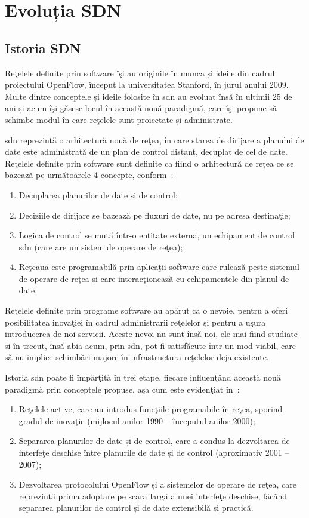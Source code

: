 \section{Evoluția SDN}

\subsection{Istoria SDN}

Reţelele definite prin software îşi au originile în munca și ideile din cadrul proiectului OpenFlow, început la universitatea Stanford, în jurul anului 2009. Multe dintre conceptele și ideile folosite în \gls{sdn} au evoluat însă în ultimii 25 de ani și acum îşi găsesc locul în această nouă paradigmă, care îşi propune să schimbe modul în care reţelele sunt proiectate și administrate.

\gls{sdn} reprezintă o arhitectură nouă de reţea, în care starea de dirijare a planului de date este administrată de un plan de control distant, decuplat de cel de date. Reţelele definite prin software sunt definite ca fiind o arhitectură de rețea ce se bazează pe următoarele 4 concepte, conform~\cite{kreutz2015software}:
\begin{enumerate}
	\item Decuplarea planurilor de date și de control;
	\item Deciziile de dirijare se bazează pe fluxuri de date, nu pe adresa destinaţie;
	\item Logica de control se mută într-o entitate externă, un echipament de control \gls{sdn} (care are un sistem de operare de reţea);
	\item Reţeaua este programabilă prin aplicaţii software care rulează peste sistemul de operare de reţea și care interacţionează cu echipamentele din planul de date.
\end{enumerate}

Reţelele definite prin programe software au apărut ca o nevoie, pentru a oferi posibilitatea inovaţiei  în cadrul administrării reţelelor și pentru a uşura introducerea de noi servicii. Aceste nevoi nu sunt însă noi, ele mai fiind studiate și în trecut, însă abia acum, prin \gls{sdn}, pot fi satisfăcute într-un mod viabil, care să nu implice schimbări majore în infrastructura reţelelor deja existente.

Istoria \gls{sdn} poate fi împărţită în trei etape, fiecare influenţând această nouă paradigmă prin conceptele propuse, aşa cum este evidenţiat în~\cite{feamster2014road}:
\begin{enumerate}
	\item Reţelele active, care au introdus funcţiile programabile în reţea, sporind gradul de inovaţie (mijlocul anilor 1990 – începutul anilor 2000);
	\item Separarea planurilor de date și de control, care a condus la dezvoltarea de interfeţe deschise între planurile de date și de control (aproximativ 2001 – 2007);
	\item Dezvoltarea protocolului OpenFlow și a sistemelor de operare de reţea, care reprezintă prima adoptare pe scară largă a unei interfeţe deschise, făcând separarea planurilor de control și de date extensibilă și practică.
\end{enumerate}

